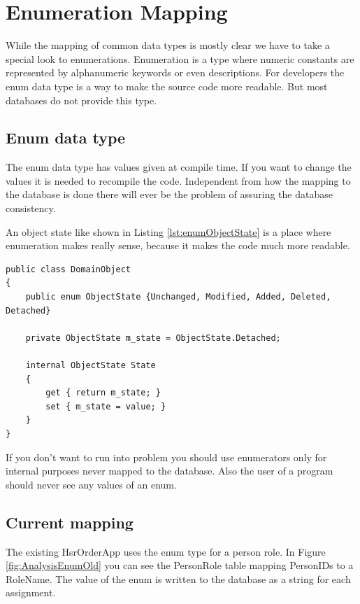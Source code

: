 \chapter{Enumeration Mapping}
\label{cha:enumerations}

	While the mapping of common data types is mostly clear we have to 
	take a special look to enumerations. Enumeration is a type where 
	numeric constants are represented by alphanumeric keywords or even 
	descriptions. For developers the enum data type is a way to make 
	the source code more readable. But most databases do not provide 
	this type.

	\section{Enum data type}
		The enum data type has values given at compile time. If you want 
		to change the values it is needed to recompile the code. Independent 
		from how the mapping to the database is done there will ever be 
		the problem of assuring the database consistency.
		
		An object state 
		like shown in Listing \ref{lst:enumObjectState} is a place where 
		enumeration makes really sense, because it makes the code much 
		more readable.
		
		\begin{lstlisting}[float=hbt,language={[Sharp]C},caption=Object state with enumeration,label=lst:enumObjectState]
public class DomainObject
{
	public enum ObjectState {Unchanged, Modified, Added, Deleted, Detached}

	private ObjectState m_state = ObjectState.Detached;

	internal ObjectState State     
	{
		get { return m_state; }
		set { m_state = value; }
	}
}
		\end{lstlisting}
		
		If you don't want to run into problem you should use enumerators only 
		for internal purposes never mapped to the database.	Also the user of a 
		program should never see any values of an enum.


	\section{Current mapping}
	
		The existing HsrOrderApp uses the enum type for a person role. In Figure
		\ref{fig:AnalysisEnumOld}	you can see the PersonRole table mapping PersonIDs 
		to a RoleName. The value of the enum is written to the database as a string
		for each assignment. 
		
